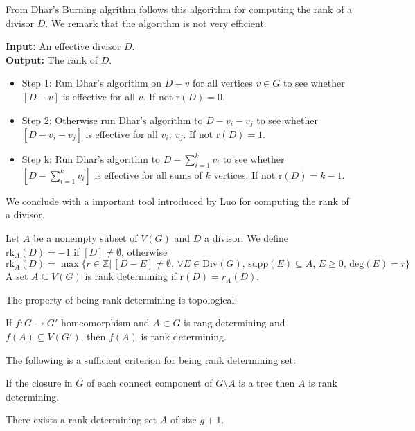 From Dhar's Burning algrithm follows this algorithm for computing the rank of a divisor $D$. We remark that the algorithm is not very efficient.
\begin{algorithm} 
{\bf Input:} An effective divisor $D$. \\
{\bf Output:} The rank of $D$. 
\begin{itemize}
\item Step 1: Run Dhar's algorithm on $D - v$ for all vertices $v \in G$ to see whether $[D-v]$ is effective for all $v$. If not r$(D) =0$. 
\item Step 2: Otherwise run Dhar's algorithm to $D - v_i - v_j$ to see whether $[D - v_i - v_j]$ is effective for all $v_i, \ v_j$. If not r$(D) = 1$. 
\item Step k: Run Dhar's algorithm to $D - \sum_{i = 1}^k v_i$ to see whether $[D - \sum_{i = 1}^k v_i]$ is effective for all sums of $k$ vertices. If not r$(D) = k-1$.  
\end{itemize}
\end{algorithm}

We conclude with a important tool introduced by Luo for computing the rank of a divisor. 
\begin{definition} Let $A$ be a nonempty  subset of  $V(G) $ and $D$ a divisor. We define $\textrm{rk}_A(D)=-1$ if $[D] \not = \emptyset$, otherwise
\[
 \textrm{rk}_A(D) = \max \big\{ r \in \mathbb{Z} | \, [D-E] \not = \emptyset, \, \forall E \in \textrm{Div}(G), \, \textrm{supp}(E) \subseteq A, \, E \geq 0, \, \textrm{deg}(E) = r\}
\]
A set $A \subseteq V(G)$ is rank determining if r$(D) = r_A(D)$. \end{definition}

The property of being rank determining is topological:

\begin{theorem} If $f: G \rightarrow G'$ homeomorphism and $A \subset G$ is rang determining and $f(A) \subseteq V(G')$, then $f(A)$ is rank determining. 
\end{theorem}
The following is a sufficient criterion for being rank determining set:
\begin{theorem} If the closure in $G$ of each connect component of $G \setminus A$ is a tree then $A$ is rank determining. \end{theorem}
\begin{corollary} There exists a rank determining set $A$ of size $g+1$. 
\end{corollary}
